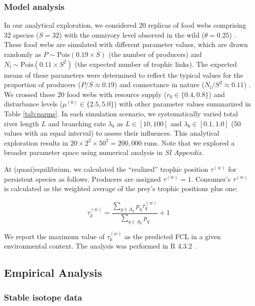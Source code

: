\documentclass[11pt, class=article, crop=false]{standalone}
\begin{document}
\subsubsection{Model analysis}

In our analytical exploration, we considered 20 replicas of food webs comprising 32 species ($S = 32$) with the omnivory level observed in the wild ($\theta = 0.25$) \cite{johnson_trophic_2014}.
These food webs are simulated with different parameter values, which are drawn randomly as $P \sim \mbox{Pois}(0.19 \times S)$ (the number of producers) and $N_l \sim \mbox{Pois}(0.11 \times S^2)$ (the expected number of trophic links).
The expected means of these parameters were determined to reflect the typical values for the proportion of producers ($P / S \approx 0.19$) \citep{briand_community_1984} and connectance in nature ($N_l / S^2 \approx 0.11$) \citep{dunne_food-web_2002}.
We crossed these 20 food webs with resource supply ($r_0 \in \{0.4, 0.8\}$) and disturbance levels ($\mu^{(0)} \in \{2.5, 5.0\}$) with other parameter values summarized in Table \ref{tab:parms}.
In each simulation scenario, we systematically varied total river length $L$ and branching rate $\lambda_b$ as $L \in [10, 100]$ and $\lambda_b \in [0.1, 1.0]$ (50 values with an equal interval) to assess their influences.
This analytical exploration results in $20 \times 2^2 \times 50^2 = 200,000$ runs.
Note that we explored a broader parameter space using numerical analysis in \textit{SI Appendix}.

At (quasi)equilibrium, we calculated the ``realized'' trophic position $\tau^{(w)}$ for persistent species as follows.
Producers are assigned $\tau^{(w)} = 1$.
Consumer's $\tau^{(w)}$ is calculated as the weighted average of the prey's trophic positions plus one:

\begin{equation}
    \tau^{(w)}_k = \frac{\sum_{q \in A_{k}} p_{q} \tau^{(w)}_q}{\sum_{q \in A_{k}} p_{q}} + 1
    \label{eq:def_tp}
\end{equation}

We report the maximum value of $\tau_k^{(w)}$ as the predicted FCL in a given environmental context.
The analysis was performed in R 4.3.2 \citep{r_program}.

\subsection{Empirical Analysis}

\subsubsection{Stable isotope data}
\end{document}
